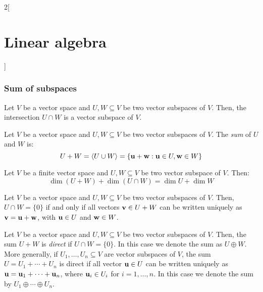 \documentclass[../../../main_math.tex]{subfiles}
\begin{document}
\begin{multicols}{2}[\section{Linear algebra}]
  \subsubsection{Sum of subspaces}
  \begin{lemma}
    Let $V$ be a vector space and $U,W\subseteq V$ be two vector subspaces of $V$. Then, the intersection $U\cap W$ is a vector subspace of $V$.
  \end{lemma}
  \begin{definition}
    Let $V$ be a vector space and $U,W\subseteq V$ be two vector subspaces of $V$. The \emph{sum} of $U$ and $W$ is: $$U+W=\langle U\cup W\rangle=\{\boldsymbol{\mathrm{u}}+\boldsymbol{\mathrm{w}}: \boldsymbol{\mathrm{u}}\in U,\boldsymbol{\mathrm{w}}\in W\}$$
  \end{definition}
  \begin{proposition}
    Let $V$ be a finite vector space and $U,W\subseteq V$ be two vector subspace of $V$. Then: $$\dim (U+W)+\dim(U\cap W)=\dim U+\dim W$$
  \end{proposition}
  \begin{lemma}
    Let $V$ be a vector space and $U,W\subseteq V$ be two vector subspaces of $V$. Then, $U\cap W=\{0\}$ if and only if all vectors $\boldsymbol{\mathrm{v}}\in U+W$ can be written uniquely as $\boldsymbol{\mathrm{v}}=\boldsymbol{\mathrm{u}}+\boldsymbol{\mathrm{w}}$, with $\boldsymbol{\mathrm{u}}\in U$ and $\boldsymbol{\mathrm{w}}\in W$.
  \end{lemma}
  \begin{definition}
    Let $V$ be a vector space and $U,W\subseteq V$ be two vector subspaces of $V$. Then, the sum $U+W$ is \emph{direct} if $U\cap W=\{0\}$. In this case we denote the sum as $U\oplus W$. More generally, if $U_1,\ldots,U_n\subseteq V$ are vector subspaces of $V$, the sum $U=U_1+\cdots+U_n$ is direct if all vector $\boldsymbol{\mathrm{u}}\in U$ can be written uniquely as $\boldsymbol{\mathrm{u}}=\boldsymbol{\mathrm{u}}_1+\cdots+\boldsymbol{\mathrm{u}}_n$, where $\boldsymbol{\mathrm{u}}_i\in U_i$ for $i=1,\ldots,n$. In this case we denote the sum by $U_1\oplus\cdots\oplus U_n$.
  \end{definition}

\end{multicols}
\end{document}
